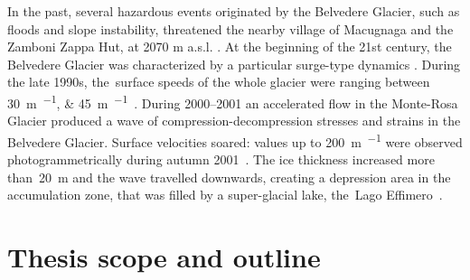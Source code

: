 In the past, several hazardous events originated by the Belvedere Glacier, such as floods
and slope instability, threatened the nearby village of Macugnaga and the Zamboni Zappa
Hut, at 2070 m a.s.l. \citep{Kaab2004}.
At the beginning of the 21st century, the Belvedere Glacier was characterized by a
particular surge-type dynamics  \citep{Haeberli2002}.
During the late 1990s, the~surface speeds of the whole glacier were ranging between
\SIlist{30;45}{\meter\per\year}~\citep{Roethlisberger1985, Kaab2005}.
During 2000--2001 an accelerated flow in the Monte-Rosa Glacier produced a wave of
compression-decompression stresses and strains in the Belvedere Glacier.
Surface velocities soared: values up to \SI{200}{\meter\per\year} were observed
photogrammetrically during autumn 2001~\citep{Kaab2004}.
The ice thickness increased more than~\SI{20}{\meter} and the wave travelled downwards,
creating a depression area in the accumulation zone, that was filled by a super-glacial
lake, the~Lago Effimero~\citep{Haeberli2002, Mortara2009}.


\section{Thesis scope and outline}

\makechapterbibliography{}